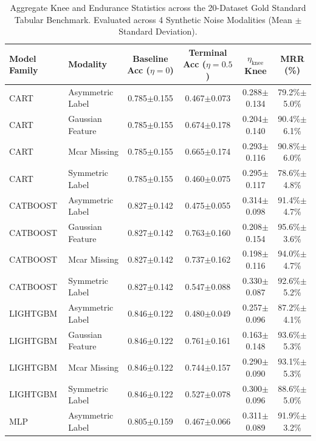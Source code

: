\begin{table}[t]
\centering
\small
\caption{Aggregate Knee and Endurance Statistics across the 20-Dataset Gold Standard Tabular Benchmark. Evaluated across 4 Synthetic Noise Modalities (Mean $\pm$ Standard Deviation).}
\label{tab:aggregate_knee_results}
\begin{tabular*}{\textwidth}{@{\extracolsep{\fill}}llcccc@{}}
\toprule
Model Family & Modality & Baseline Acc ($\eta=0$) & Terminal Acc ($\eta=0.5$) & $\eta_{\mathrm{knee}}$ Knee & MRR (\%) \\
\midrule
CART & Asymmetric Label & 0.785$\pm$0.155 & 0.467$\pm$0.073 & 0.288$\pm$0.134 & 79.2\%$\pm$5.0\% \\
CART & Gaussian Feature & 0.785$\pm$0.155 & 0.674$\pm$0.178 & 0.204$\pm$0.140 & 90.4\%$\pm$6.1\% \\
CART & Mcar Missing & 0.785$\pm$0.155 & 0.665$\pm$0.174 & 0.293$\pm$0.116 & 90.8\%$\pm$6.0\% \\
CART & Symmetric Label & 0.785$\pm$0.155 & 0.460$\pm$0.075 & 0.295$\pm$0.117 & 78.6\%$\pm$4.8\% \\
\midrule
CATBOOST & Asymmetric Label & 0.827$\pm$0.142 & 0.475$\pm$0.055 & 0.314$\pm$0.098 & 91.4\%$\pm$4.7\% \\
CATBOOST & Gaussian Feature & 0.827$\pm$0.142 & 0.763$\pm$0.160 & 0.208$\pm$0.154 & 95.6\%$\pm$3.6\% \\
CATBOOST & Mcar Missing & 0.827$\pm$0.142 & 0.737$\pm$0.162 & 0.198$\pm$0.116 & 94.0\%$\pm$4.7\% \\
CATBOOST & Symmetric Label & 0.827$\pm$0.142 & 0.547$\pm$0.088 & 0.330$\pm$0.087 & 92.6\%$\pm$5.2\% \\
\midrule
LIGHTGBM & Asymmetric Label & 0.846$\pm$0.122 & 0.480$\pm$0.049 & 0.257$\pm$0.096 & 87.2\%$\pm$4.1\% \\
LIGHTGBM & Gaussian Feature & 0.846$\pm$0.122 & 0.761$\pm$0.161 & 0.163$\pm$0.148 & 93.6\%$\pm$5.3\% \\
LIGHTGBM & Mcar Missing & 0.846$\pm$0.122 & 0.744$\pm$0.157 & 0.290$\pm$0.090 & 93.1\%$\pm$5.3\% \\
LIGHTGBM & Symmetric Label & 0.846$\pm$0.122 & 0.527$\pm$0.078 & 0.300$\pm$0.096 & 88.6\%$\pm$5.0\% \\
\midrule
MLP & Asymmetric Label & 0.805$\pm$0.159 & 0.467$\pm$0.066 & 0.311$\pm$0.089 & 91.9\%$\pm$3.2\% \\

\end{tabular*}
\end{table}
